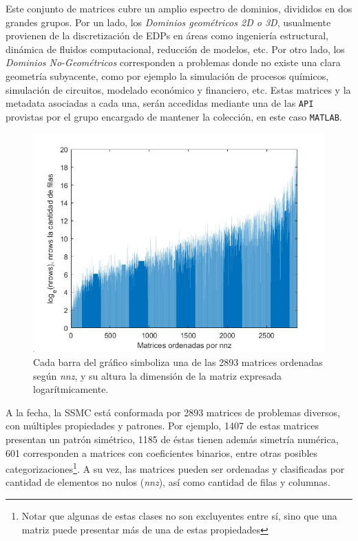 

Este conjunto de matrices cubre un amplio espectro de dominios, divididos en dos grandes grupos. Por un lado, los \textit{Dominios geométricos 2D o 3D}, usualmente provienen de la discretización de EDPs en áreas como ingeniería estructural, dinámica de fluidos computacional, reducción de modelos, etc. Por otro lado, los \textit{Dominios No-Geométricos} corresponden a problemas donde no existe una clara geometría subyacente, como por ejemplo la simulación de procesos químicos, simulación de circuitos, modelado económico y financiero, etc. Estas matrices y la metadata asociadas a cada una, serán accedidas mediante una de las \texttt{API} provistas por el grupo encargado de mantener la colección, en este caso \texttt{MATLAB}.
\begin{figure}[h]
    \centering
    \includegraphics[width=\textwidth]{imagenes/chap4/matrix-sizes.jpg}
    \caption{Cada barra del gráfico simboliza una de las 2893 matrices ordenadas según \textit{nnz}, y su altura la dimensión de la matriz expresada logarítmicamente.}
    \label{fig:matrix-sizes}
\end{figure}
A la fecha, la SSMC está conformada por 2893 matrices de problemas diversos, con múltiples propiedades y patrones. Por ejemplo, 1407 de estas matrices presentan un patrón simétrico, 1185 de éstas tienen además simetría numérica, 601 corresponden a matrices con coeficientes binarios, entre otras posibles categorizaciones\footnote{Notar que algunas de estas clases no son excluyentes entre sí, sino que una matriz puede presentar más de una de estas propiedades}.
A su vez, las matrices pueden ser ordenadas y clasificadas por cantidad de elementos no nulos (\textit{nnz}), así como cantidad de filas y columnas.

